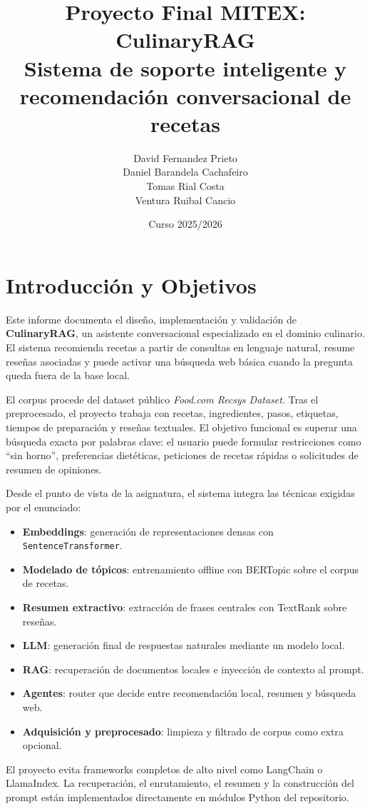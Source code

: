 \documentclass[11pt,a4paper]{article}
\title{\textbf{Proyecto Final MITEX: CulinaryRAG}\\Sistema de soporte inteligente y recomendación conversacional de recetas}
\author{David Fernandez Prieto \\ Daniel Barandela Cachafeiro \\ Tomas Rial Costa \\ Ventura Ruibal Cancio}
\date{Curso 2025/2026}
\begin{document}
\maketitle
\newpage
\tableofcontents
\newpage

\section{Introducción y Objetivos}

Este informe documenta el diseño, implementación y validación de \textbf{CulinaryRAG}, un asistente conversacional especializado en el dominio culinario. El sistema recomienda recetas a partir de consultas en lenguaje natural, resume reseñas asociadas y puede activar una búsqueda web básica cuando la pregunta queda fuera de la base local.

El corpus procede del dataset público \textit{Food.com Recsys Dataset}. Tras el preprocesado, el proyecto trabaja con recetas, ingredientes, pasos, etiquetas, tiempos de preparación y reseñas textuales. El objetivo funcional es superar una búsqueda exacta por palabras clave: el usuario puede formular restricciones como ``sin horno'', preferencias dietéticas, peticiones de recetas rápidas o solicitudes de resumen de opiniones.

Desde el punto de vista de la asignatura, el sistema integra las técnicas exigidas por el enunciado:
\begin{itemize}
    \item \textbf{Embeddings}: generación de representaciones densas con \texttt{SentenceTransformer}.
    \item \textbf{Modelado de tópicos}: entrenamiento offline con BERTopic sobre el corpus de recetas.
    \item \textbf{Resumen extractivo}: extracción de frases centrales con TextRank sobre reseñas.
    \item \textbf{LLM}: generación final de respuestas naturales mediante un modelo local.
    \item \textbf{RAG}: recuperación de documentos locales e inyección de contexto al prompt.
    \item \textbf{Agentes}: router que decide entre recomendación local, resumen y búsqueda web.
    \item \textbf{Adquisición y preprocesado}: limpieza y filtrado de corpus como extra opcional.
\end{itemize}

El proyecto evita frameworks completos de alto nivel como LangChain o LlamaIndex. La recuperación, el enrutamiento, el resumen y la construcción del prompt están implementados directamente en módulos Python del repositorio.
\end{document}
